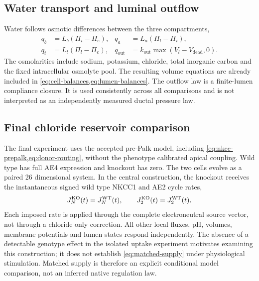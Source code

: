 \subsection{Water transport and luminal outflow}

Water follows osmotic differences between the three compartments,
\begin{align*}
    q_b&=L_b(\Pi_i-\Pi_e), & q_a&=L_a(\Pi_l-\Pi_i),\\
    q_t&=L_t(\Pi_l-\Pi_e), & q_{\mathrm{out}}&=k_{\mathrm{out}}\max(V_l-V_{\mathrm{dead}},0).
\end{align*}
The osmolarities include sodium, potassium, chloride, total inorganic carbon and the fixed intracellular osmolyte pool. The resulting volume equations are already included in \cref{eq:cell-balances,eq:lumen-balances}. The outflow law is a finite-lumen compliance closure. It is used consistently across all comparisons and is not interpreted as an independently measured ductal pressure law.

\subsection{Final chloride reservoir comparison}
\label{sec:reservoir-comparison}

The final experiment uses the accepted pre-Palk model, including \cref{eq:nkcc-prepalk,eq:donor-routing}, without the phenotype calibrated apical coupling. Wild type has full AE4 expression and knockout has zero. The two cells evolve as a paired 26 dimensional system. In the central construction, the knockout receives the instantaneous signed wild type NKCC1 and AE2 cycle rates,
\begin{equation}
 J_N^{\rm KO}(t)=J_N^{\rm WT}(t),\qquad
 J_2^{\rm KO}(t)=J_2^{\rm WT}(t).
 \label{eq:matched-supply}
\end{equation}
Each imposed rate is applied through the complete electroneutral source vector, not through a chloride only correction. All other local fluxes, pH, volumes, membrane potentials and lumen states respond independently. The absence of a detectable genotype effect in the isolated uptake experiment motivates examining this construction; it does not establish \cref{eq:matched-supply} under physiological stimulation. Matched supply is therefore an explicit conditional model comparison, not an inferred native regulation law.

